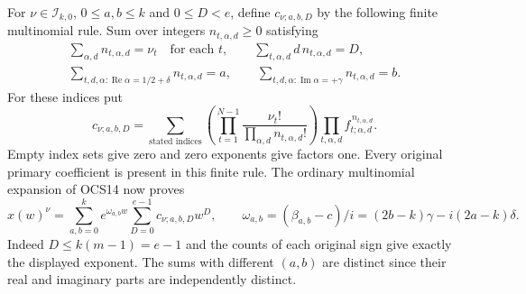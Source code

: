 \documentclass[11pt,a4paper]{article}
\begin{document}
For $\nu\in\mathcal I_{k,0}$, $0\leq a,b\leq k$ and
$0\leq D<e$, define $c_{\nu;a,b,D}$ by the following finite
multinomial rule. Sum over integers $n_{t,\alpha,d}\geq0$ satisfying
\[
 \begin{gathered}
 \sum_{\alpha,d}n_{t,\alpha,d}=\nu_t\quad\text{for each }t,\qquad
 \sum_{t,\alpha,d}d\,n_{t,\alpha,d}=D,\\
 \sum_{t,d,\alpha:\operatorname{Re}\alpha=1/2+\delta}
                                 n_{t,\alpha,d}=a,\qquad
 \sum_{t,d,\alpha:\operatorname{Im}\alpha=+\gamma}
                                 n_{t,\alpha,d}=b.
 \end{gathered}
\]
For these indices put
\[
 c_{\nu;a,b,D}=
 \sum_{\text{stated indices}}
   \left(\prod_{t=1}^{N-1}
             \frac{\nu_t!}{\prod_{\alpha,d}n_{t,\alpha,d}!}\right)
        \prod_{t,\alpha,d}f_{t;\alpha,d}^{\,n_{t,\alpha,d}}.
 \tag{OCS15}
\]
Empty index sets give zero and zero exponents give factors one.
Every original primary coefficient is present in this finite rule.
The ordinary multinomial expansion of OCS14 now proves
\[
 x(w)^\nu=\sum_{a,b=0}^k e^{\omega_{a,b}w}
                   \sum_{D=0}^{e-1}c_{\nu;a,b,D}w^D,
 \qquad
 \omega_{a,b}=(\beta_{a,b}-c)/i
                 =(2b-k)\gamma-i(2a-k)\delta.
 \tag{OCS16}
\]
Indeed $D\leq k(m-1)=e-1$ and the counts of each original
sign give exactly the displayed exponent. The sums with different
$(a,b)$ are distinct since their real and imaginary parts are
independently distinct.
\end{document}
